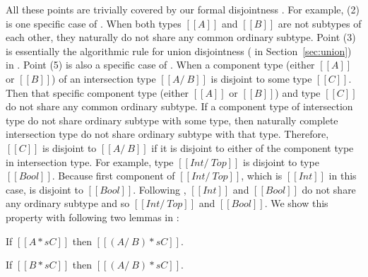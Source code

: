 \noindent All these points are trivially covered by our formal disjointness .
For example, (2) is one specific case of .
When both types $[[A]]$ and
$[[B]]$ are not subtypes of each other, they naturally do not share any common ordinary subtype.
Point (3) is essentially the algorithmic
rule for union disjointness ( in Section~\ref{sec:union}) in \cal.
Point (5) is also a specific case of .
When a component type (either $[[A]]$ or $[[B]]$) of an intersection type $[[A /\ B]]$
is disjoint to some type $[[C]]$. Then that specific
component type (either $[[A]]$ or $[[B]]$) and type $[[C]]$ 
do not share any common ordinary subtype.
If a component type of intersection type do not share ordinary subtype
with some type, then naturally complete intersection type do not share
ordinary subtype with that type. 
Therefore, $[[C]]$ is disjoint to $[[A /\ B]]$ if it is disjoint to either of
the component type in intersection type.
For example, type $[[Int /\ Top]]$ is disjoint to type $[[Bool]]$.
Because first component of $[[Int /\ Top]]$, which is $[[Int]]$ in this case,
is disjoint to $[[Bool]]$.
Following , $[[Int]]$ and $[[Bool]]$ do not share any
ordinary subtype and so $[[Int /\ Top]]$ and $[[Bool]]$.
We show this property with following two lemmas in \name:

\begin{lemma}
  If $[[A *s C]]$ then $[[(A /\ B) *s C]]$.
\label{lemma:discussion:comp:left:inter}
\end{lemma}

\begin{lemma}
  If $[[B *s C]]$ then $[[(A /\ B) *s C]]$.
\label{lemma:discussion:comp:right:inter}
\end{lemma}